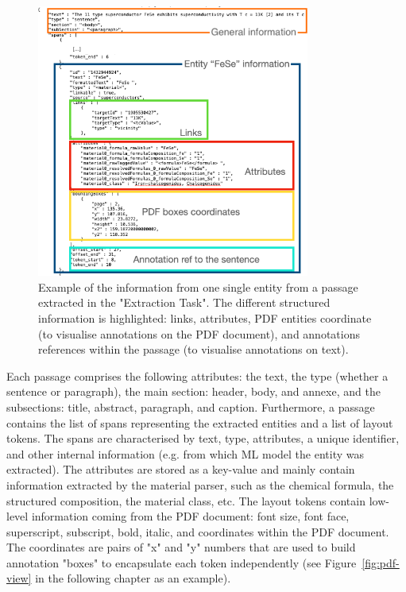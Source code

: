 \begin{figure}[htbp]
  \centering
  \includegraphics[width=0.8\textwidth]{figures/curation/data-flow-2} 
  \caption{Example of the information from one single entity from a passage extracted in the "Extraction Task". The different structured information is highlighted: links, attributes, PDF entities coordinate (to visualise annotations on the PDF document), and annotations references within the passage (to visualise annotations on text).}
  \label{fig:data-flow-2}
\end{figure}

Each passage comprises the following attributes: the text, the type (whether a sentence or paragraph), the main section: header, body, and annexe, and the subsections: title, abstract, paragraph, and caption.
Furthermore, a passage contains the list of spans representing the extracted entities and a list of layout tokens. 
The spans are characterised by text, type, attributes, a unique identifier, and other internal information (e.g. from which ML model the entity was extracted). 
The attributes are stored as a key-value and mainly contain information extracted by the material parser, such as the chemical formula, the structured composition, the material class, etc.
The layout tokens contain low-level information coming from the PDF document: font size, font face, superscript, subscript, bold, italic, and coordinates within the PDF document. The coordinates are pairs of "x" and "y" numbers that are used to build annotation "boxes" to encapsulate each token independently (see Figure~\ref{fig:pdf-view} in the following chapter as an example). 

